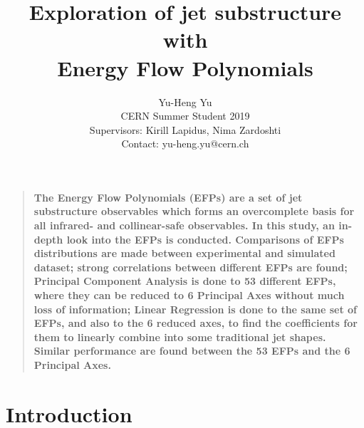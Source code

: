 \documentclass[12pt]{article}
\title{Exploration of jet substructure with \\ Energy Flow Polynomials}
\author{Yu-Heng Yu\\
\normalsize{CERN Summer Student 2019}\\
\normalsize{Supervisors: Kirill Lapidus, Nima Zardoshti}\\
\normalsize{Contact: yu-heng.yu@cern.ch}\\
}
\date{}
\newenvironment{sciabstract}{%
\begin{quote} \bf}
{\end{quote}}
\begin{document}
\maketitle

\begin{sciabstract}
The Energy Flow Polynomials (EFPs) are a set of jet substructure observables which forms an overcomplete basis for all infrared- and collinear-safe observables. In this study, an in-depth look into the EFPs is conducted. Comparisons of EFPs distributions are made between experimental and simulated dataset; strong correlations between different EFPs are found; Principal Component Analysis is done to 53 different EFPs, where they can be reduced to 6 Principal Axes without much loss of information; Linear Regression is done to the same set of EFPs, and also to the 6 reduced axes, to find the coefficients for them to linearly combine into some traditional jet shapes. Similar performance are found between the 53 EFPs and the 6 Principal Axes.
\end{sciabstract}
\section{Introduction}

\end{document}
